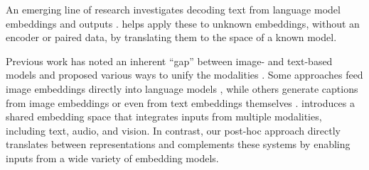  An emerging line of research investigates decoding text from language model embeddings \citep{song2020informationleakageembeddingmodels, li2023sentenceembeddingleaksinformation, morris2023textembeddingsrevealalmost} and outputs \citep{morris2023languagemodelinversion, carlini2024stealingproductionlanguagemodel, zhang2024extractingpromptsinvertingllm}.  
\atk{} helps apply these to unknown embeddings, without an encoder or paired data, by translating them to the space of a known model. 

 Previous work has noted an inherent ``gap” between image- and text-based models \citep{liang2022mindgapunderstandingmodality} and proposed various ways to unify the modalities \citep{song2023bridgegapmodalitiescomprehensive}. Some approaches feed image embeddings directly into language models \citep{koh2023fromage, wang2023visionllm, dong2024dreamllmsynergisticmultimodalcomprehension, liu2023visualinstructiontuning}, while others generate captions from image embeddings \citep{mokady2021clipcap} or even from text embeddings themselves \citep{morris2023textembeddingsrevealalmost}. \citep{girdhar2023imagebind} introduces a shared embedding space that integrates inputs from multiple modalities, including text, audio, and vision. In contrast, our post-hoc approach directly translates between representations and complements these systems by enabling inputs from a wide variety of embedding models.